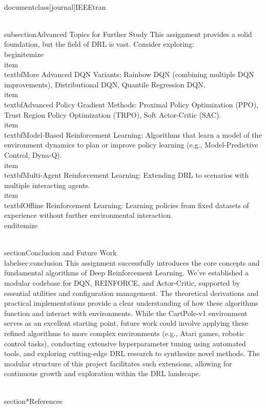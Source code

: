 \\documentclass[journal]{IEEEtran}
\begin{document}
\\subsection{Advanced Topics for Further Study}
This assignment provides a solid foundation, but the field of DRL is vast. Consider exploring:
\\begin{itemize}
    \\item \\textbf{More Advanced DQN Variants}: Rainbow DQN (combining multiple DQN improvements), Distributional DQN, Quantile Regression DQN.
    \\item \\textbf{Advanced Policy Gradient Methods}: Proximal Policy Optimization (PPO), Trust Region Policy Optimization (TRPO), Soft Actor-Critic (SAC).
    \\item \\textbf{Model-Based Reinforcement Learning}: Algorithms that learn a model of the environment dynamics to plan or improve policy learning (e.g., Model-Predictive Control, Dyna-Q).
    \\item \\textbf{Multi-Agent Reinforcement Learning}: Extending DRL to scenarios with multiple interacting agents.
    \\item \\textbf{Offline Reinforcement Learning}: Learning policies from fixed datasets of experience without further environmental interaction.
\\end{itemize}

\\section{Conclusion and Future Work}
\\label{sec:conclusion}
This assignment successfully introduces the core concepts and fundamental algorithms of Deep Reinforcement Learning. We've established a modular codebase for DQN, REINFORCE, and Actor-Critic, supported by essential utilities and configuration management. The theoretical derivations and practical implementations provide a clear understanding of how these algorithms function and interact with environments. While the CartPole-v1 environment serves as an excellent starting point, future work could involve applying these refined algorithms to more complex environments (e.g., Atari games, robotic control tasks), conducting extensive hyperparameter tuning using automated tools, and exploring cutting-edge DRL research to synthesize novel methods. The modular structure of this project facilitates such extensions, allowing for continuous growth and exploration within the DRL landscape.

\\section*{References}
\
\

\
\end{document}
